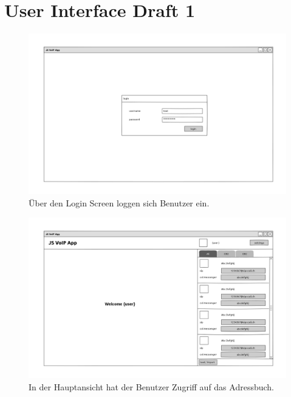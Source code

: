 \begin{landscape}

	\label{uiDrafts} 
	\chapter{User Interface Draft 1}

	\begin{figure}[H]
		\centering
		\includegraphics[height=0.6\textwidth]{../ui/img/login_page.png}
		\caption{Über den Login Screen loggen sich Benutzer ein.}
		\label{login screen}
	\end{figure}
	\begin{figure}[H]
		\centering
		\includegraphics[height=0.8\textwidth]{../ui/img/main_view.png}
		\caption{In der Hauptansicht hat der Benutzer Zugriff auf das Adressbuch.}
		\label{main screen}

\end{figure}
\end{landscape}

